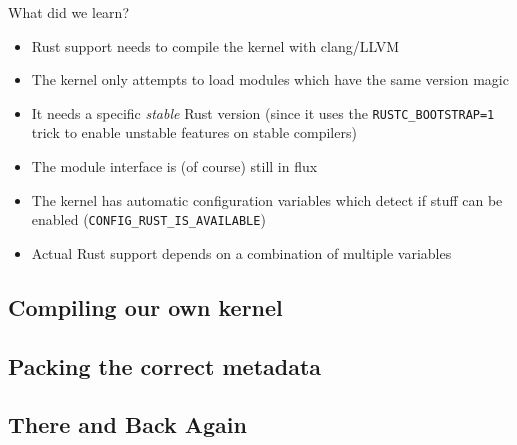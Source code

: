 \begin{frame}[c,fragile]{What did we learn?}
  \small
\begin{itemize}
\item Rust support needs to compile the kernel with clang/LLVM
\item The kernel only attempts to load modules which have the same version magic
\item It needs a specific \emph{stable} Rust version {\footnotesize(since it uses the
\texttt{RUSTC\_BOOTSTRAP=1} trick to enable unstable features on stable compilers)}
\item The module interface is (of course) still in flux
\item The kernel has automatic configuration variables which detect if stuff can be enabled (\texttt{CONFIG\_RUST\_IS\_AVAILABLE})
\item Actual Rust support depends on a combination of multiple variables
\end{itemize}
\end{frame}

\subsection{Compiling our own kernel}

\subsection{Packing the correct metadata}

\subsection{There and Back Again}
